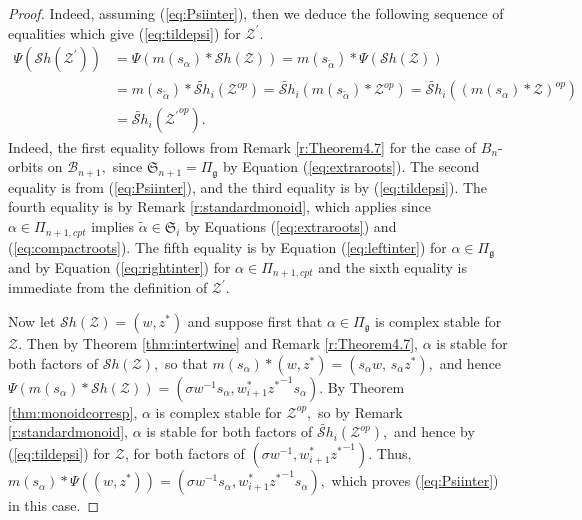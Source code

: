 \documentclass[12pt]{amsart}
\numberwithin{equation}{section}
\newcommand{\cZ}{{\mathcal Z}}
\newcommand{\alphatilde}{{\tilde{\alpha}}}
\newcommand{\fg}{\mbox{${\mathfrak g}$}}
\newcommand{\B}{\mathcal{B}}
\newcommand{\ms}{m(s_{\alpha})}
\newcommand{\Sh}{\mathcal{S}h}
\begin{document}
\begin{proof}
 Indeed, assuming (\ref{eq:Psiinter}), then we deduce the following sequence of equalities which give (\ref{eq:tildepsi}) for $\cZ^{\prime}.$
 \begin{equation*}
 \begin{split}
 \Psi(\Sh(\cZ^{\prime}))&=\Psi(\ms*\Sh(\cZ))=m(s_{\alphatilde})*\Psi(\Sh(\cZ))\\
 &=m(s_{\alphatilde})*\widetilde{\Sh}_{i}(\cZ^{op})=\widetilde{\Sh}_{i}(m(s_{\alphatilde})*\cZ^{op})=\widetilde{\Sh}_
{i}((\ms*\cZ)^{op})\\
&= \widetilde{\Sh}_{i}({\cZ^{\prime}}^{op}).
 \end{split}
 \end{equation*}
 Indeed, the first equality follows from Remark \ref{r:Theorem4.7} for the case of $B_n$-orbits on $\B_{n+1},$ since ${\mathfrak{S}}_{n+1}=\Pi_{\fg}$ by Equation 
 (\ref{eq:extraroots}).  The second equality is from (\ref{eq:Psiinter}), and the third equality is by (\ref{eq:tildepsi}).  The fourth equality is by Remark \ref{r:standardmonoid},  which applies since $\alpha \in \Pi_{n+1,cpt}$ implies $\alphatilde \in {\mathfrak{S}}_{i}$ by Equations (\ref{eq:extraroots}) and (\ref{eq:compactroots}).  The fifth equality is by Equation (\ref{eq:leftinter}) for $\alpha \in \Pi_{\fg}$ and by Equation (\ref{eq:rightinter}) for $\alpha \in \Pi_{n+1,cpt}$  and the sixth equality is immediate from the definition of $\cZ^{\prime}.$


Now let $\Sh(\cZ)=(w,z^{*})$ and suppose first that $\alpha\in\Pi_{\fg}$ is complex stable for $\cZ.$  Then by Theorem \ref{thm:intertwine} and Remark \ref{r:Theorem4.7}, $\alpha$ is stable for both factors of $\Sh(\cZ),$ so that $\ms*(w,z^{*})= (s_{\alpha} w, \, s_{\alpha} z^{*}),$ and hence $\Psi(\ms*\Sh(\cZ))=(\sigma w^{-1} s_{\alpha},w_{i+1}^{*} {z^{*}}^{-1}s_{\alpha}).$   By Theorem \ref{thm:monoidcorresp}, $\alpha$ is complex stable for ${\cZ}^{op},$ so by Remark \ref{r:standardmonoid}, $\alpha$ is  stable for both factors of $\widetilde{\Sh}_{i}(\cZ^{op}),$ and hence by (\ref{eq:tildepsi}) for $\cZ$, for both factors of $(\sigma w^{-1}, w_{i+1}^{*} {z^{*}}^{-1}).$  Thus, $\ms*\Psi((w,z^{*}))=(\sigma w^{-1}s_{\alpha}, w_{i+1}^{*} {z^{*}}^{-1}s_{\alpha}),$ which proves (\ref{eq:Psiinter}) in this case.


\end{proof}
\end{document}
